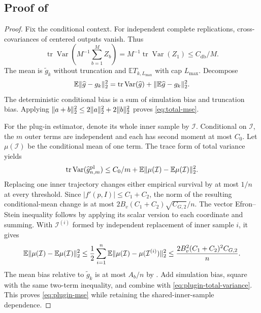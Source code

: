 \documentclass[11pt]{article}
\newcommand{\E}{\mathbb E}
\newcommand{\Var}{\operatorname{Var}}
\newcommand{\1}{\mathbf 1}
\newcommand{\tr}{\operatorname{tr}}
\DeclarePairedDelimiter{\norm}{\lVert}{\rVert}
\newcommand{\db}{\mathrm{db}}
\newcommand{\pl}{\mathrm{pl}}
\begin{document}
\subsection{Proof of \texorpdfstring{}{the variance theorem}}
\begin{proof}
Fix the conditional context. For independent complete replications, cross-covariances of centered outputs vanish. Thus
\[
 \tr\Var\left(M^{-1}\sum_{b=1}^MZ_b\right)
 =M^{-1}\tr\Var(Z_1)\le C_{\db}/M.
\]
The mean is $\widetilde g_k$ without truncation and $\E T_{k,L_{\max}}$ with cap $L_{\max}$. Decompose
\[
 \E\norm{\widehat g-g_k}_2^2
 =\tr\Var(\widehat g)+\norm{\E\widehat g-g_k}_2^2.
\]
The deterministic conditional bias is a sum of simulation bias and truncation bias. Applying $\norm{a+b}_2^2\le2\norm a_2^2+2\norm b_2^2$ proves \eqref{eq:total-mse}.

For the plug-in estimator, denote its whole inner sample by $\mathcal I$. Conditional on $\mathcal I$, the $m$ outer terms are independent and each has second moment at most $C_0$. Let $\mu(\mathcal I)$ be the conditional mean of one term. The trace form of total variance yields
\begin{equation}\label{eq:plugin-total-variance}
 \tr\Var(\widehat g_{n,m}^{\pl})
 \le C_0/m+\E\norm{\mu(\mathcal I)-\E \mu(\mathcal I)}_2^2.
\end{equation}
Replacing one inner trajectory changes either empirical survival by at most $1/n$ at every threshold. Since $|f'(p,I)|\le C_1+C_2$, the norm of the resulting conditional-mean change is at most
$2B_v(C_1+C_2)\sqrt{C_{G,2}}/n$.
The vector Efron--Stein inequality follows by applying its scalar version to each coordinate and summing. With $\mathcal I^{(i)}$ formed by independent replacement of inner sample $i$, it gives
\[
 \E\norm{\mu(\mathcal I)-\E \mu(\mathcal I)}_2^2
 \le\frac12\sum_{i=1}^n\E\norm{\mu(\mathcal I)-\mu(\mathcal I^{(i)})}_2^2
 \le\frac{2B_v^2(C_1+C_2)^2C_{G,2}}{n}.
\]
The mean bias relative to $\widetilde g_k$ is at most $A_b/n$ by . Add simulation bias, square with the same two-term inequality, and combine with \eqref{eq:plugin-total-variance}. This proves \eqref{eq:plugin-mse} while retaining the shared-inner-sample dependence.
\end{proof}
\end{document}
